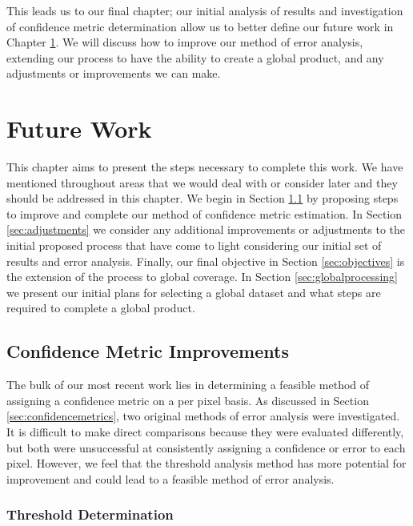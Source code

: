 \documentclass{book}
\begin{document}
This leads us to our final chapter; our initial analysis of results and investigation of confidence metric determination allow us to better define our future work in Chapter \ref{ch:futurework}.  We will discuss how to improve our method of error analysis, extending our process to have the ability to create a global product, and any adjustments or improvements we can make.

\chapter{Future Work}
\label{ch:futurework}

This chapter aims to present the steps necessary to complete this work.  We have mentioned throughout areas that we would deal with or consider later and they should be addressed in this chapter.  We begin in Section \ref{sec:confidenceimprovements} by proposing steps to improve and complete our method of confidence metric estimation.  In Section \ref{sec:adjustments} we consider any additional improvements or adjustments to the initial proposed process that have come to light considering our initial set of results and error analysis.  Finally, our final objective in Section \ref{sec:objectives} is the extension of the process to global coverage.  In Section \ref{sec:globalprocessing} we present our initial plans for selecting a global dataset and what steps are required to complete a global product.

\section{Confidence Metric Improvements}
\label{sec:confidenceimprovements}

The bulk of our most recent work lies in determining a feasible method of assigning a confidence metric on a per pixel basis.  As discussed in Section \ref{sec:confidencemetrics}, two original methods of error analysis were investigated.  It is difficult to make direct comparisons because they were evaluated differently, but both were unsuccessful at consistently assigning a confidence or error to each pixel.  However, we feel that the threshold analysis method has more potential for improvement and could lead to a feasible method of error analysis.

\subsection{Threshold Determination}
\label{sec:thresholddetermination}
\end{document}
